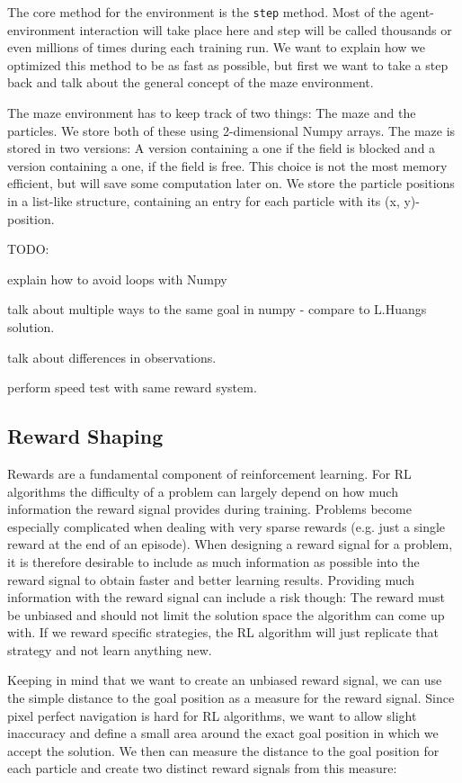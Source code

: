 The core method for the environment is the \texttt{step} method. Most of the agent-environment interaction will take place here and step will be called thousands or even millions of times during each training run. We want to explain how we optimized this method to be as fast as possible, but first we want to take a step back and talk about the general concept of the maze environment.

The maze environment has to keep track of two things: The maze and the particles. We store both of these using 2-dimensional Numpy arrays. The maze is stored in two versions: A version containing a one if the field is blocked and a version containing a one, if the field is free. This choice is not the most memory efficient, but will save some computation later on. We store the particle positions in a list-like structure, containing an entry for each particle with its (x, y)-position. 

TODO: 

explain how to avoid loops with Numpy

talk about multiple ways to the same goal in numpy - compare to L.Huangs solution.

talk about differences in observations. 

perform speed test with same reward system.

\subsection{Reward Shaping} \label{sec:MazeReward}
Rewards are a fundamental component of reinforcement learning. For RL algorithms the difficulty of a problem can largely depend on how much information the reward signal provides during training. Problems become especially complicated when dealing with very sparse rewards (e.g. just a single reward at the end of an episode). When designing a reward signal for a problem, it is therefore desirable to include as much information as possible into the reward signal to obtain faster and better learning results. Providing much information with the reward signal can include a risk though: The reward must be unbiased and should not limit the solution space the algorithm can come up with. If we reward specific strategies, the RL algorithm will just replicate that strategy and not learn anything new.

Keeping in mind that we want to create an unbiased reward signal, we can use the simple distance to the goal position as a measure for the reward signal. Since pixel perfect navigation is hard for RL algorithms, we want to allow slight inaccuracy and define a small area around the exact goal position in which we accept the solution. We then can measure the distance to the goal position for each particle and create two distinct reward signals from this measure:

